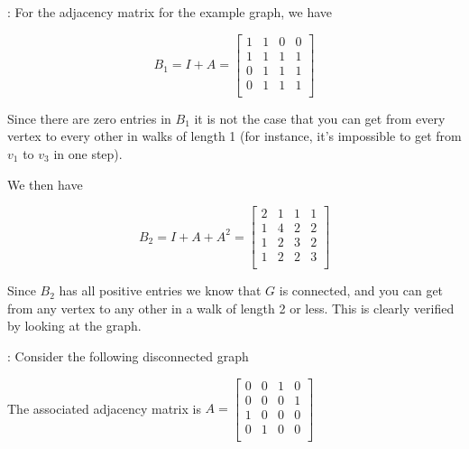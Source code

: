 \documentclass[12pt]{article}
\newcommand{\nin}{\noindent}
\newcommand{\vthree}{\vspace{3mm}}
\newcommand{\mymat}[1]{
\left[
\begin{array}{rrrrrrrrrrrrrrrrrrrrrrrrrrrrrrrrrrrrrrr}
#1
\end{array}
\right]
}
\begin{document}
\nin {\bf Example 5}:  For the adjacency matrix for the example graph, we have

\[
B_1 = I + A =
\mymat{
1 & 1 & 0 & 0 \\
1 & 1 & 1 & 1 \\
0 & 1 & 1 & 1 \\
0 & 1 & 1 & 1 \\
}
\]

\vthree

\nin Since there are zero entries in $B_1$ it is not the case that you can get from every vertex to every other in walks of length 1 (for instance, it's impossible to get from $v_1$ to $v_3$ in one step).

\vthree

\nin We then have

\[
B_2 = I + A + A^2 =
\mymat{
2 & 1 & 1 & 1 \\
1 & 4 & 2 & 2 \\
1 & 2 & 3 & 2 \\
1 & 2 & 2 & 3 \\
}
\]

\vthree

\nin Since $B_2$ has all positive entries we know that $G$ is connected, and you can get from any vertex to any other in a walk of length 2 or less.  This is clearly verified by looking at the graph.

\clearpage

\nin {\bf Example 6}: Consider the following disconnected graph

\vthree

\begin{center}
\end{center}

\vthree

\nin The associated adjacency matrix is $A =
\mymat{
0 & 0 & 1 & 0 \\
0 & 0 & 0 & 1 \\
1 & 0 & 0 & 0 \\
0 & 1 & 0 & 0 \\
}
$
\end{document}
